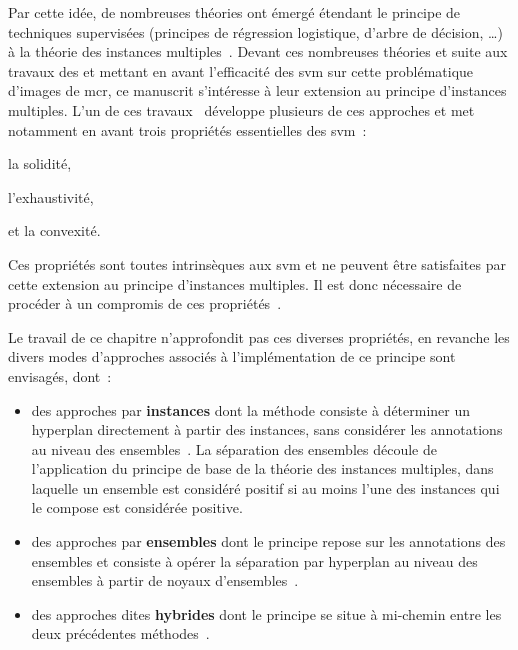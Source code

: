 Par cette idée, de nombreuses théories ont émergé étendant le principe de techniques supervisées (principes de régression logistique, d'arbre de décision, \ldots) à la théorie des instances multiples~\cite{Maron1998,Xu2004,Blockeel2005}. Devant ces nombreuses théories et suite aux travaux des  et  mettant en avant l'efficacité des \gls{svm} sur cette problématique d'images de \gls{mcr}, ce manuscrit s'intéresse à leur extension au principe d'instances multiples. L'un de ces travaux~\cite{Doran2013} développe plusieurs de ces approches et met notamment en avant trois propriétés essentielles des \gls{svm}~:
\begin{inlinerate}
    \item la solidité,
    \item l'exhaustivité,
    \item et la convexité.
\end{inlinerate} Ces propriétés sont toutes intrinsèques aux \gls{svm} et ne peuvent être satisfaites par cette extension au principe d'instances multiples. Il est donc nécessaire de procéder à un compromis de ces propriétés~\cite{Doran2013}.\par

Le travail de ce chapitre n'approfondit pas ces diverses propriétés, en revanche les divers modes d'approches associés à l'implémentation de ce principe sont envisagés, dont~: 
\begin{itemize}
    \item des approches par \textbf{instances} dont la méthode consiste à déterminer un hyperplan directement à partir des instances, sans considérer les annotations au niveau des ensembles~\cite{Andrews2003}. La séparation des ensembles découle de l'application du principe de base de la théorie des instances multiples, dans laquelle un ensemble est considéré positif si au moins l'une des instances qui le compose est considérée positive.
    \clearpage
    \item des approches par \textbf{ensembles} dont le principe repose sur les annotations des ensembles et consiste à opérer la séparation par hyperplan au niveau des ensembles à partir de noyaux d'ensembles~\cite{Gartner2002}.
    \item des approches dites \textbf{hybrides} dont le principe se situe à mi-chemin entre les deux précédentes méthodes~\cite{Bunescu2007}.
\end{itemize}\par 

